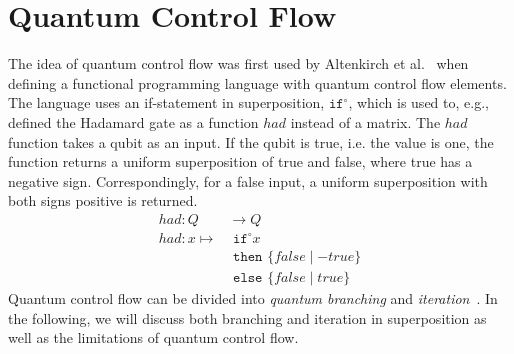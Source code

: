 \section{Quantum Control Flow}
The idea of quantum control flow was first used by Altenkirch et al.~\cite{AlGr05} when defining a functional programming language with quantum control flow elements. The language uses an if-statement in superposition, $\texttt{if}^\circ$, which is used to, e.g., defined the Hadamard gate as a function $had$ instead of a matrix. The $had$ function takes a qubit as an input. If the qubit is true, i.e. the value is one, the function returns a uniform superposition of true and false, where true has a negative sign. Correspondingly, for a false input, a uniform superposition with both signs positive is returned.
\begin{align*}
    had : Q& \to Q\\
    had : x \mapsto& \texttt{ if}^\circ x\\
                   & \texttt{ then } \{false \mid -true\}\\
                   & \texttt{ else } \{false \mid true\}
\end{align*}
Quantum control flow can be divided into \emph{quantum branching} and \emph{iteration}~\cite{YVC24}. In the following, we will discuss both branching and iteration in superposition as well as the limitations of quantum control flow. 


